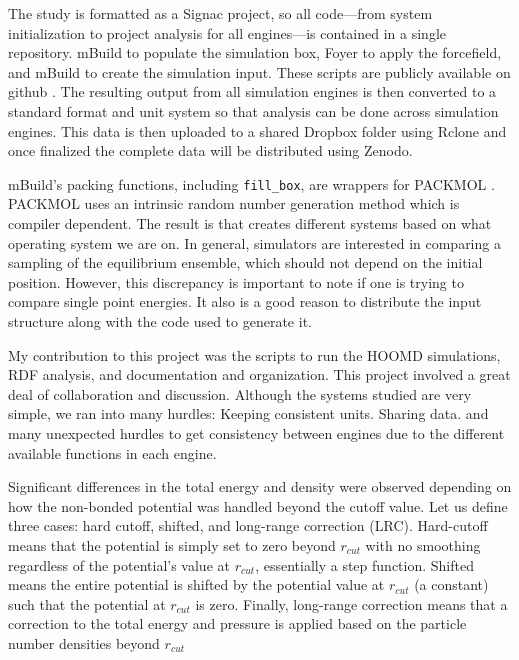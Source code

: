 The study is formatted as a Signac project, so all code---from system initialization to project analysis for all engines---is contained in a single repository.
mBuild to populate the simulation box, Foyer to apply the forcefield, and mBuild to create the simulation input.
These scripts are publicly available on github \citep{reproducibility}.
The resulting output from all simulation engines is then converted to a standard format and unit system so that analysis can be done across simulation engines.
This data is then uploaded to a shared Dropbox folder using Rclone and once finalized the complete data will be distributed using Zenodo.

mBuild's packing functions, including \lstinline{fill_box}, are wrappers for PACKMOL \citep{Martinez2003, Martinez2009}.
PACKMOL uses an intrinsic random number generation method which is compiler dependent. 
The result is that creates different systems based on what operating system we are on.
In general, simulators are interested in comparing a sampling of the equilibrium ensemble, which should not depend on the initial position.
However, this discrepancy is important to note if one is trying to compare single point energies.
It also is a good reason to distribute the input structure along with the code used to generate it.

My contribution to this project was the scripts to run the HOOMD simulations, RDF analysis, and documentation and organization. 
This project involved a great deal of collaboration and discussion.
Although the systems studied are very simple, we ran into many hurdles:
Keeping consistent units.
Sharing data.
and many unexpected hurdles to get consistency between engines due to the different available functions in each engine. %

Significant differences in the total energy and density were observed depending on how the non-bonded potential was handled beyond the cutoff value.
Let us define three cases: hard cutoff, shifted, and long-range correction (LRC). 
Hard-cutoff means that the potential is simply set to zero beyond $r_{cut}$ with no smoothing regardless of the potential’s value at $r_{cut}$, essentially a step function.
Shifted means the entire potential is shifted by the potential value at $r_{cut}$ (a constant) such that the potential at $r_{cut}$ is zero.
Finally, long-range correction means that a correction to the total energy and pressure is applied based on the particle number densities beyond $r_{cut}$ 

